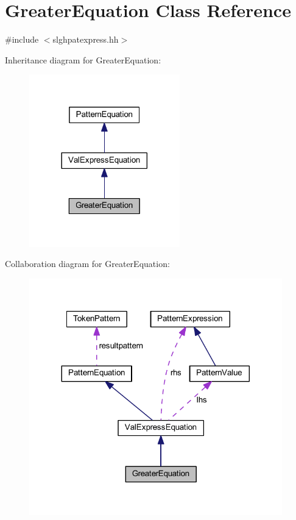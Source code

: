 \hypertarget{class_greater_equation}{}\section{Greater\+Equation Class Reference}
\label{class_greater_equation}


{\ttfamily \#include $<$slghpatexpress.\+hh$>$}



Inheritance diagram for Greater\+Equation\+:
\nopagebreak
\begin{figure}[H]
\begin{center}
\leavevmode
\includegraphics[width=185pt]{class_greater_equation__inherit__graph}
\end{center}
\end{figure}


Collaboration diagram for Greater\+Equation\+:
\nopagebreak
\begin{figure}[H]
\begin{center}
\leavevmode
\includegraphics[width=311pt]{class_greater_equation__coll__graph}
\end{center}
\end{figure}
